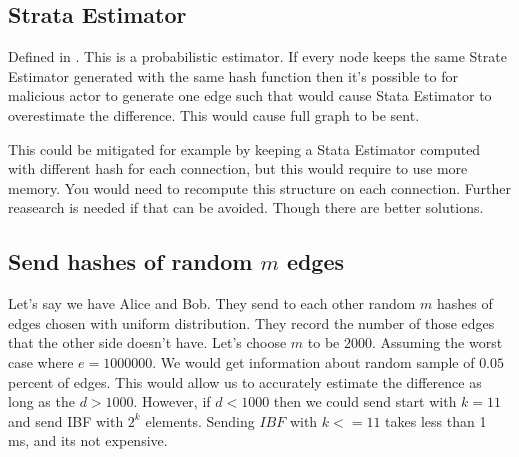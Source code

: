 \documentclass[11pt]{article}
\begin{document}
\subsection{Strata Estimator}
Defined in \cite{esrwpc}.
This is a probabilistic estimator.
If every node keeps the same Strate Estimator generated with the same hash function then it's possible to for malicious actor to generate one edge such that would cause Stata Estimator to overestimate the difference. This would cause full graph to be sent.

This could be mitigated for example by keeping a Stata Estimator computed with different hash for each connection, but this would require to use more memory.
You would need to recompute this structure on each connection.
Further reasearch is needed if that can be avoided.
Though there are better solutions.
\subsection{Send hashes of random $m$ edges}
Let's say we have Alice and Bob.
They send to each other random $m$ hashes of edges chosen with uniform distribution.
They record the number of those edges that the other side doesn't have.
Let's choose $m$ to be $2000$.
Assuming the worst case where $e = 1000000$.
We would get information about random sample of $0.05$ percent of edges.
This would allow us to accurately estimate the difference as long as the $d > 1000$.
However, if $d < 1000$ then we could send start with $k = 11$ and send IBF with $2^k$ elements.
Sending $IBF$ with $k <= 11$ takes less than 1 ms, and its not expensive.
\end{document}
